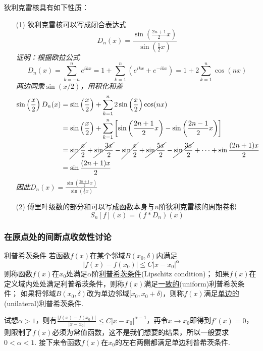 \documentclass[main.tex]{subfiles}
\begin{document}
狄利克雷核具有如下性质：
\begin{itemize}
    \item [(1)] 狄利克雷核可以写成闭合表达式
    \[D_n(x)=\frac{\sin\left(\frac{2n+1}{2}x\right)}{\sin\left(\frac{1}{2}x\right)}\]
    \textit{
        证明：根据欧拉公式
        \[D_n(x) = \sum_{k=-n}^{n}e^{ikx} = 1+\sum_{k=1}^{n}(e^{ikx}+e^{-ikx}) = 1+2\sum_{k=1}^{n}\cos(nx)\]
        两边同乘\(\sin(x/2)\)，用积化和差
        \begin{align*}
            \sin\left(\frac{x}{2}\right)D_n(x) &= \sin\left(\frac{x}{2}\right)+\sum_{k=1}^{n}2\sin\left(\frac{x}{2}\right)\cos(nx) \\
            &= \sin\left(\frac{x}{2}\right)+\sum_{k=1}^{n}\left[\sin\left(\frac{2n+1}{2}x\right)-\sin\left(\frac{2n-1}{2}x\right)\right] \\
            &= \cancel{\sin\frac{x}{2}}+\cancel{\sin\frac{3x}{2}}-\cancel{\sin\frac{x}{2}}+\cancel{\sin\frac{5x}{2}}-\cancel{\sin\frac{3x}{2}}+\cdots+\sin\frac{(2n+1)x}{2} \\
            &= \sin\frac{(2n+1)x}{2}
        \end{align*}
        因此\(\displaystyle{D_n(x)=\frac{\sin\left(\frac{2n+1}{2}x\right)}{\sin\left(\frac{1}{2}x\right)}}\)
    }
    \item [(2)] 傅里叶级数的部分和可以写成函数本身与\(n\)阶狄利克雷核的周期卷积
    \[S_n[f](x) = (f*D_n)(x)\]
\end{itemize}

\subsubsection{在原点处的间断点收敛性讨论}

\begin{definition}{利普希茨条件}
    若函数\(f(x)\)在某个邻域\(B(x_0,\delta)\)内满足
    \[|f(x)-f(x_0)| \leq C|x-x_0|^\alpha\]
    则称函数\(f(x)\)在\(x_0\)处满足\(\alpha\)阶\uline{利普希茨条件}(Lipschitz condition)；
    \newline
    如果\(f(x)\)在定义域内处处满足利普希茨条件，则称\(f(x)\)满足\uline{一致的}(uniform)利普希茨条件；
    \newline
    如果将邻域\(B(x_0,\delta)\)改为单边邻域\([x_0,x_0+\delta)\)，则称\(f(x)\)满足\uline{单边的}(unilateral)利普希茨条件.
\end{definition}

试想\(\alpha>1\)，则有\(\displaystyle{\frac{|f(x)-f(x_0)|}{|x-x_0|} \leq C|x-x_0|^{\alpha-1}}\)，再令\(x\to x_0\)即得到\(f'(x)=0\)，则限制了\(f(x)\)必须为常值函数，这不是我们想要的结果，所以一般要求\(0<\alpha<1\). 接下来令函数\(f(x)\)在\(x_0\)的左右两侧都满足单边利普希茨条件.
\end{document}

